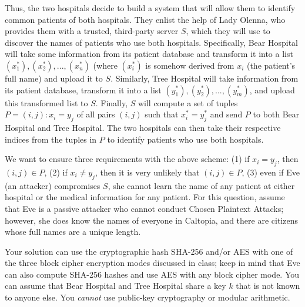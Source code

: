 \documentclass[12pt]{exam}
\begin{document}
\begin{Form}
\begin{questions}
Thus, the two hospitals decide to build a system that will allow them to
identify common patients of both hospitals.
They enlist the help of Lady Olenna, who provides them with a trusted,
third-party server $S$, which they will use to discover the names of patients
who use both hospitals.
Specifically, Bear Hospital will take some information from its patient
database and transform it into a list $(x^*_1), (x^*_2),..., (x^*_n)$ (where
$(x^*_i)$ is somehow derived from $x_i$ (the patient's full name) and upload it to $S$.
Similarly, Tree Hospital will take information from its patient database,
transform it into a list $(y^*_1), (y^*_2),..., (y^*_m)$, and upload this
transformed list to $S$.
Finally, $S$ will compute a set of tuples $P = {(i, j) : x_i = y_j}$ of all
pairs $(i, j)$ such that $x^*_i = y^*_j$ and send $P$ to both Bear Hospital and
Tree Hospital.
The two hospitals can then take their respective indices from the tuples in $P$
to identify patients who use both hospitals.

We want to ensure three requirements with the above scheme:
(1) if $x_i=y_j$, then $(i,j) \in P$,
(2) if $x_i\ne y_j$, then it is very unlikely that $(i,j) \in P$,
(3) even if Eve (an attacker) compromises $S$, she cannot learn the name of any
patient at either hospital or the medical information for any patient.
For this question, assume that Eve is a passive
attacker who cannot conduct Chosen Plaintext Attacks; however, she does know the
names of everyone in Caltopia, and there are citizens whose full names are
a unique length.

Your solution can use the cryptographic hash SHA-256
and/or AES with one of the three block cipher encryption modes discussed in
class; keep in mind that Eve can also compute SHA-256 hashes and use AES with
any block cipher mode.
You can assume that Bear Hospital and Tree Hospital share a key $k$
that is not known to anyone else.
You \emph{cannot} use public-key cryptography or modular arithmetic.

\end{questions}
\end{Form}
\end{document}
